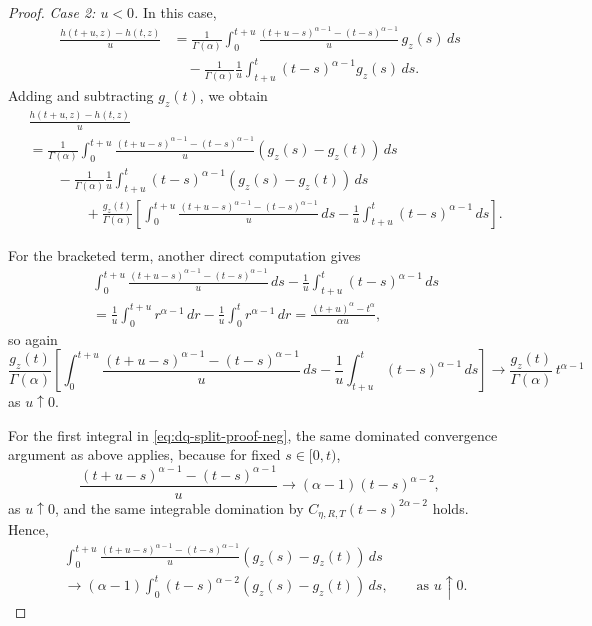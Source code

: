 \documentclass[letterpaper]{article}
\numberwithin{equation}{section}
\theoremstyle{definition}
\theoremstyle{remark}
\begin{document}
\begin{proof}
\smallskip
\noindent
\emph{Case 2: $u<0$.}
In this case,
\begin{align*}
  \frac{h(t+u,z)-h(t,z)}{u}
  &=
  \frac{1}{\Gamma(\alpha)}
  \int_0^{t+u}
  \frac{(t+u-s)^{\alpha-1}-(t-s)^{\alpha-1}}{u}\,g_z(s)\,ds
  \\
  &\quad
  -
  \frac{1}{\Gamma(\alpha)}
  \frac{1}{u}\int_{t+u}^{t}(t-s)^{\alpha-1}g_z(s)\,ds.
\end{align*}
Adding and subtracting $g_z(t)$, we obtain
\begin{align}
  &\frac{h(t+u,z)-h(t,z)}{u}\nonumber\\
  &=
  \frac{1}{\Gamma(\alpha)}
  \int_0^{t+u}
  \frac{(t+u-s)^{\alpha-1}-(t-s)^{\alpha-1}}{u}
  \left(g_z(s)-g_z(t)\right)\,ds
  \nonumber\\
  &\qquad
  -
  \frac{1}{\Gamma(\alpha)}
  \frac{1}{u}\int_{t+u}^{t}(t-s)^{\alpha-1}
  \left(g_z(s)-g_z(t)\right)\,ds
  \nonumber\\
  &\qquad\qquad+
  \frac{g_z(t)}{\Gamma(\alpha)}
  \left[
    \int_0^{t+u}
    \frac{(t+u-s)^{\alpha-1}-(t-s)^{\alpha-1}}{u}\,ds
    -
    \frac{1}{u}\int_{t+u}^{t}(t-s)^{\alpha-1}\,ds
  \right].
  \label{eq:dq-split-proof-neg}
\end{align}

For the bracketed term, another direct computation gives
\begin{align*}
  &\int_0^{t+u}
  \frac{(t+u-s)^{\alpha-1}-(t-s)^{\alpha-1}}{u}\,ds
  -
  \frac{1}{u}\int_{t+u}^{t}(t-s)^{\alpha-1}\,ds
  \\
  &=
  \frac{1}{u}\int_0^{t+u}r^{\alpha-1}\,dr
  -
  \frac{1}{u}\int_0^t r^{\alpha-1}\,dr
  =
  \frac{(t+u)^\alpha-t^\alpha}{\alpha u},
\end{align*}
so again
\begin{equation}\label{eq:bracket-limit-neg}
  \frac{g_z(t)}{\Gamma(\alpha)}
  \left[
    \int_0^{t+u}
    \frac{(t+u-s)^{\alpha-1}-(t-s)^{\alpha-1}}{u}\,ds
    -
    \frac{1}{u}\int_{t+u}^{t}(t-s)^{\alpha-1}\,ds
  \right]
  \to
  \frac{g_z(t)}{\Gamma(\alpha)}\,t^{\alpha-1}
\end{equation}
as $u\uparrow0$.

For the first integral in \eqref{eq:dq-split-proof-neg}, the same dominated convergence argument as above applies, because for fixed $s\in[0,t)$,
\[
  \frac{(t+u-s)^{\alpha-1}-(t-s)^{\alpha-1}}{u}
  \to
  (\alpha-1)(t-s)^{\alpha-2},
\]
as $u\uparrow0$, and the same integrable domination by
$C_{\eta,R,T}(t-s)^{2\alpha-2}$ holds. Hence,
\begin{align}
  &\int_0^{t+u}
  \frac{(t+u-s)^{\alpha-1}-(t-s)^{\alpha-1}}{u}
  \left(g_z(s)-g_z(t)\right)\,ds
  \nonumber\\
  &\to
  (\alpha-1)\int_0^t (t-s)^{\alpha-2}\left(g_z(s)-g_z(t)\right)\,ds,
  \qquad\text{as }u\uparrow0.
  \label{eq:first-integral-limit-neg}
\end{align}


\end{proof}
\end{document}
